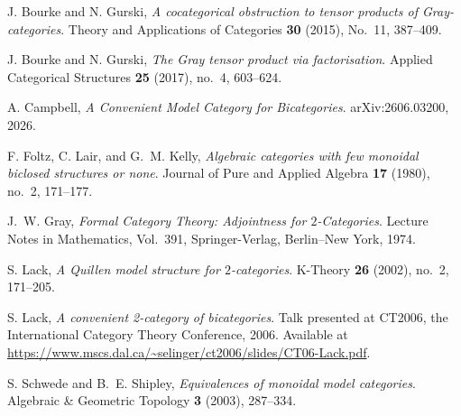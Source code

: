 \documentclass{tac}
\begin{document}
\begin{references*}
J. Bourke and N. Gurski,
\emph{A cocategorical obstruction to tensor products of Gray-categories}.
Theory and Applications of Categories \textbf{30} (2015), No.~11, 387--409.

J. Bourke and N. Gurski,
\emph{The Gray tensor product via factorisation}.
Applied Categorical Structures \textbf{25} (2017), no.~4, 603--624.

A. Campbell,
\emph{A Convenient Model Category for Bicategories}.
arXiv:2606.03200, 2026.

F. Foltz, C. Lair, and G.~M. Kelly,
\emph{Algebraic categories with few monoidal biclosed structures or none}.
Journal of Pure and Applied Algebra \textbf{17} (1980), no.~2, 171--177.

J.~W. Gray,
\emph{Formal Category Theory: Adjointness for $2$-Categories}.
Lecture Notes in Mathematics, Vol.~391,
Springer-Verlag, Berlin--New York, 1974.

S. Lack,
\emph{A Quillen model structure for $2$-categories}.
K-Theory \textbf{26} (2002), no.~2, 171--205.

S. Lack,
\emph{A convenient 2-category of bicategories}.
Talk presented at CT2006, the International Category Theory Conference,
2006. Available at
\url{https://www.mscs.dal.ca/~selinger/ct2006/slides/CT06-Lack.pdf}.

S. Schwede and B.~E. Shipley,
\emph{Equivalences of monoidal model categories}.
Algebraic \& Geometric Topology \textbf{3} (2003), 287--334.
\end{references*}
\end{document}
